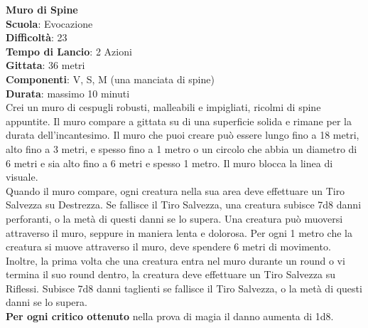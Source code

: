 \begin{multicols}{2}
\medskip\textbf{Muro di Spine}\\
\textbf{Scuola}: Evocazione\\
\textbf{Difficoltà}:  23\\
\textbf{Tempo di Lancio}: 2 Azioni\\
\textbf{Gittata}: 36 metri\\
\textbf{Componenti}: V, S, M (una manciata di spine)\\
\textbf{Durata}: massimo 10 minuti\\
Crei un muro di cespugli robusti, malleabili e impigliati, ricolmi di spine appuntite. Il muro compare a gittata su di una superficie solida e rimane per la durata dell'incantesimo. Il muro che puoi creare può essere lungo fino a 18 metri, alto fino a 3 metri, e spesso fino a 1 metro o un circolo che abbia un diametro di 6 metri e sia alto fino a 6 metri e spesso 1 metro. Il muro blocca la linea di visuale.\\
Quando il muro compare, ogni creatura nella sua area deve effettuare un Tiro Salvezza su Destrezza. Se fallisce il Tiro Salvezza, una creatura subisce 7d8 danni perforanti, o la metà di questi danni se lo supera. Una creatura può muoversi attraverso il muro, seppure in maniera lenta e dolorosa. Per ogni 1 metro che la creatura si muove attraverso il muro, deve spendere 6 metri di movimento. Inoltre, la prima volta che una creatura entra nel muro durante un round o vi termina il suo round dentro, la creatura deve effettuare un Tiro Salvezza su Riflessi. Subisce 7d8 danni taglienti se fallisce il Tiro Salvezza, o la metà di questi danni se lo supera.\\
\textbf{Per ogni critico ottenuto} nella prova di magia il danno aumenta di 1d8.


\end{multicols}
